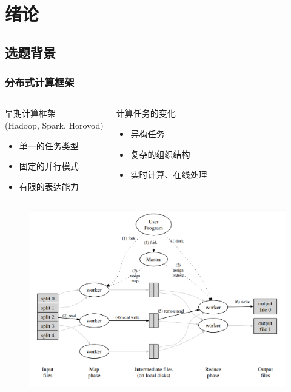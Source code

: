 \section{绪论}

\subsection*{选题背景}

\begin{frame}
	\frametitle{分布式计算框架}
	\vspace{-1.2em}
	\begin{columns}[t]
		\begin{block}{早期计算框架\\(Hadoop, Spark, Horovod)}
			\begin{itemize}
				\item 单一的任务类型
				\item 固定的并行模式
				\item 有限的表达能力
			\end{itemize}
		\end{block}
		\begin{block}{计算任务的变化}
			\begin{itemize}
				\item 异构任务
				\item 复杂的组织结构
				\item 实时计算、在线处理
			\end{itemize}
		\end{block}
	\end{columns}
	\begin{columns}[onlytextwidth]
		\begin{figure}
			\centering
			\includegraphics[width=\textwidth]{image/chap01/mapreduce.png}	

\end{figure}
\end{columns}
\end{frame}
